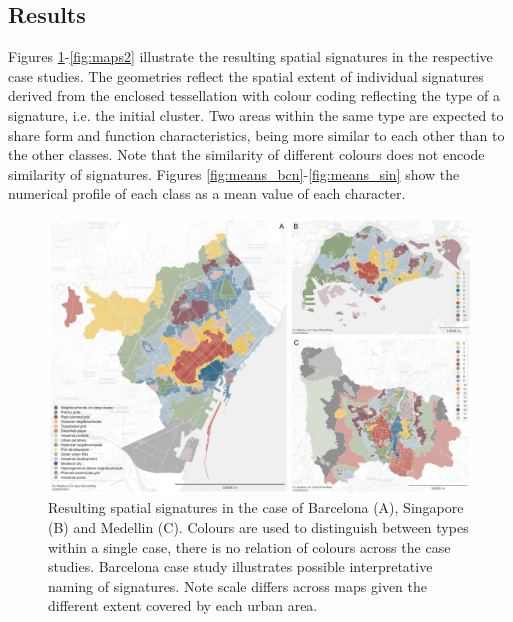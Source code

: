 \subsection{Results}

Figures \ref{fig:maps1}-\ref{fig:maps2} illustrate the resulting spatial signatures in the respective case
studies. The geometries reflect the spatial extent of individual signatures
derived from the enclosed tessellation
with colour coding reflecting the type of a signature, i.e. the initial cluster. Two
areas within the same type are expected to share form and function characteristics, being more similar to each other than to the
other classes. Note that the similarity of different colours does not encode
similarity of signatures. Figures \ref{fig:means_bcn}-\ref{fig:means_sin} show the numerical
profile of each class as a mean value of each character.

\begin{figure}
    \includegraphics[width=\linewidth]{figures/maps1.png}
    \caption{Resulting spatial signatures in the case of Barcelona (A), Singapore (B)
    and Medellin (C). Colours are used to distinguish between types within a
    single case, there is no relation of colours across the case studies. Barcelona
    case study illustrates possible interpretative naming of signatures.
    Note scale differs across maps given the different extent
    covered by each urban area.}
    \label{fig:maps1}
\end{figure}

